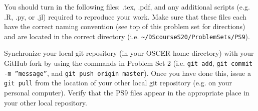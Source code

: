 \documentclass[12pt,english]{exam}
\begin{document}
\begin{questions}
\question You should turn in the following files: .tex, .pdf, and any additional scripts (e.g. .R, .py, or .jl) required to reproduce your work.  Make sure that these files each have the correct naming convention (see top of this problem set for directions) and are located in the correct directory (i.e. \texttt{\textasciitilde/DScourseS20/ProblemSets/PS9}).

\question Synchronize your local git repository (in your OSCER home directory) with your GitHub fork by using the commands in Problem Set 2 (i.e. \texttt{git add}, \texttt{git commit -m ''message''}, and \texttt{git push origin master}). Once you have done this, issue a \texttt{git pull} from the location of your other local git repository (e.g. on your personal computer). Verify that the PS9 files appear in the appropriate place in your other local repository.

\end{questions}
\end{document}
